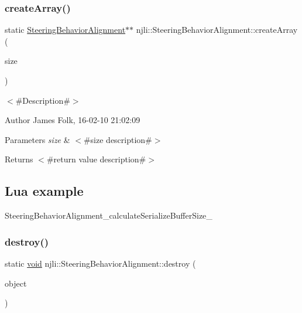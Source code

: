 \subsubsection{\texorpdfstring{create\+Array()}{createArray()}}
{\footnotesize\ttfamily static \mbox{\hyperlink{classnjli_1_1_steering_behavior_alignment}{Steering\+Behavior\+Alignment}}$\ast$$\ast$ njli\+::\+Steering\+Behavior\+Alignment\+::create\+Array (\begin{DoxyParamCaption}\item[{const \mbox{\hyperlink{_util_8h_a10e94b422ef0c20dcdec20d31a1f5049}{u32}}}]{size }\end{DoxyParamCaption})\hspace{0.3cm}{\ttfamily [static]}}



$<$\#\+Description\#$>$ 

\begin{DoxyAuthor}{Author}
James Folk, 16-\/02-\/10 21\+:02\+:09
\end{DoxyAuthor}

\begin{DoxyParams}{Parameters}
{\em size} & $<$\#size description\#$>$\\
\hline
\end{DoxyParams}
\begin{DoxyReturn}{Returns}
$<$\#return value description\#$>$
\end{DoxyReturn}
\hypertarget{classnjli_1_1_steering_behavior_wander_ex1}{}\subsection{Lua example}\label{classnjli_1_1_steering_behavior_wander_ex1}

\begin{DoxyCodeInclude}
\end{DoxyCodeInclude}
Steering\+Behavior\+Alignment\+\_\+calculate\+Serialize\+Buffer\+Size\+\_\+ \mbox{\label{classnjli_1_1_steering_behavior_alignment_a4d6922da07d5042beb9d9130939ca412}} 
\subsubsection{\texorpdfstring{destroy()}{destroy()}}
{\footnotesize\ttfamily static \mbox{\hyperlink{_thread_8h_af1e856da2e658414cb2456cb6f7ebc66}{void}} njli\+::\+Steering\+Behavior\+Alignment\+::destroy (\begin{DoxyParamCaption}\item[{\mbox{\hyperlink{classnjli_1_1_steering_behavior_alignment}{Steering\+Behavior\+Alignment}} $\ast$}]{object }\end{DoxyParamCaption})\hspace{0.3cm}{\ttfamily [static]}}



